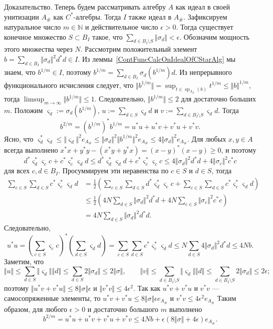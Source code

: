 \documentclass[12pt]{article}
\numberwithin{equation}{subsection}
\theoremstyle{plain}
\newenvironment{proof}{Доказательство.}{}
\begin{document}
\begin{fulltext}
\begin{proof}
Теперь будем рассматривать алгебру $A$ как идеал в своей унитизации $A_\#$ как
$C^*$-алгебры. Тогда $I$ также идеал в $A_\#$. Зафиксируем натуральное число
$m\in\mathbb{N}$ и действительное число $\epsilon>0$. Тогда существует конечное
множество $S\subset B_I$ такое, что $\sum_{d\in B_I\setminus
S}\Vert\sigma_d\Vert<\epsilon$. Обозначим мощность этого множества через $N$.
Рассмотрим положительный элемент $b=\sum_{d\in B_I}\Vert\sigma_d\Vert^2 d^*d\in
I$. Из леммы~\ref{ContFuncCalcOnIdealOfCStarAlg} мы знаем, что $b^{1/m}\in I$,
поэтому $b^{1/m}=\sum_{d\in B_I}\sigma_d(b^{1/m})d$. Из непрерывного
функционального исчисления следует, что $\Vert
b^{1/m}\Vert=\sup_{t\in\operatorname{sp}_{A_\#}(b)} t^{1/m}\leq\Vert
b\Vert^{1/m}$, тогда $\limsup_{m\to\infty}\Vert b^{1/m}\Vert\leq 1$.
Следовательно, $\Vert b^{1/m}\Vert\leq 2$ для достаточно больших $m$. Положим
$\varsigma_d:=\sigma_d(b^{1/m})$, $u:=\sum_{d\in S}\varsigma_d d$ и
$v:=\sum_{d\in B_I\setminus S}\varsigma_d d$. Тогда 
$$
b^{2/m}={(b^{1/m})}^*b^{1/m}=u^*u+u^*v+v^*u+v^*v.
$$
Ясно, что $\varsigma_d^*\varsigma_d\leq \Vert \varsigma_d\Vert^2 e_{A_\#}\leq
\Vert \sigma_d\Vert^2\Vert b^{1/m}\Vert^2 e_{A_\#}\leq 4\Vert \sigma_d\Vert^2
e_{A_\#}$. Для любых $x,y\in A$ всегда выполнено
$x^*x+y^*y-(x^*y+y^*x)={(x-y)}^*(x-y)\geq 0$, и поэтому 
$$
d^*\varsigma_d^* \varsigma_c c+c^*\varsigma_c^* \varsigma_d d
\leq d^*\varsigma_d^*\varsigma_d d + c^*\varsigma_c^*\varsigma_c c
\leq 4\Vert \sigma_d\Vert^2 d^*d+4\Vert \sigma_c\Vert^2 c^*c
$$
для всех $c,d\in B_I$. Просуммируем эти неравенства по $c\in S$ и $d\in S$,
тогда
$$
\begin{aligned}
\sum_{c\in S}\sum_{d\in S}c^*\varsigma_c^* \varsigma_d d
&=\frac{1}{2}\left(\sum_{c\in S}\sum_{d\in S}d^*\varsigma_d^* \varsigma_c c+
\sum_{c\in S}\sum_{d\in S}c^*\varsigma_c^* \varsigma_d d\right)\\
&\leq\frac{1}{2}\left(4 N\sum_{d\in S} \Vert \sigma_d\Vert^2 d^*d+
4 N\sum_{c\in S} \Vert \sigma_c\Vert^2 c^*c\right)\\
&=4 N\sum_{d\in S} \Vert \sigma_d\Vert^2 d^*d.
\end{aligned}
$$
Следовательно,
$$
u^*u
={\left(\sum_{c\in S}\varsigma_c c\right)}^*\left(\sum_{d\in S}\varsigma_d d\right)
=\sum_{c\in S}\sum_{d\in S}c^*\varsigma_c^* \varsigma_d d
\leq N\sum_{d\in S} 4\Vert \sigma_d\Vert^2 d^*d
\leq 4N b.
$$
Заметим, что
$$
\Vert u\Vert
\leq \sum_{d\in S}\Vert\varsigma_d\Vert\Vert d\Vert
\leq \sum_{d\in S}2\Vert\sigma_d\Vert
\leq 2\Vert\sigma\Vert,
\qquad
\Vert v\Vert
\leq \sum_{d\in B_I\setminus S}\Vert\varsigma_d\Vert\Vert d\Vert
\leq \sum_{d\in B_I\setminus S}2\Vert\sigma_d\Vert
\leq 2\epsilon;
$$
поэтому $\Vert u^*v+v^*u\Vert\leq 8\Vert\sigma\Vert\epsilon$ и $\Vert
v^*v\Vert\leq 4\epsilon^2$. Так как $u^*v+v^*u$ и $v^*v$ ---  самосопряженные
элементы, то $u^*v+v^*u\leq 8\Vert\sigma\Vert\epsilon e_{A_\#}$ и $v^*v\leq
4\epsilon^2 e_{A_\#}$ Таким образом, для любого $\epsilon>0$ и достаточно
большого $m$ выполнено 
$$
b^{2/m}
=u^*u+u^*v+v^*u+v^*v
\leq 4Nb+\epsilon(8\Vert\sigma\Vert+4\epsilon)e_{A_\#}.
$$


\end{proof}
\end{fulltext}
\end{document}
